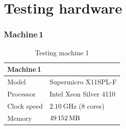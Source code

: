 \documentclass[
  color, %
  table, %
  lof,   %
  lot,   %
]{fithesis3}
\begin{document}




\printbibliography[heading=bibintoc]


\appendix
\chapter{Testing hardware}
\label{hardware}

\addtolength{\textheight}{1.75in}
\addtolength{\topmargin}{-1in}
\subsection{Machine\,1}
\label{hw:1}
\begin{table}[!htb]
\centering
\begin{tabular}{|l|l|}
\hline
   \multicolumn{2}{|l|}{Machine\,1} \\ \hline %
    Model & Supermicro X11SPL-F\\
    \hline
    Processor & Intel Xeon Silver 4110  \\
    \hline
    Clock speed & $\SI{2.10}{\giga\hertz}$ (8 cores) \\
    \hline
    Memory & $\SI{49152}{\mega\byte}$ \\
    \hline
\end{tabular}
\caption{Testing machine 1}
\end{table}
\end{document}
